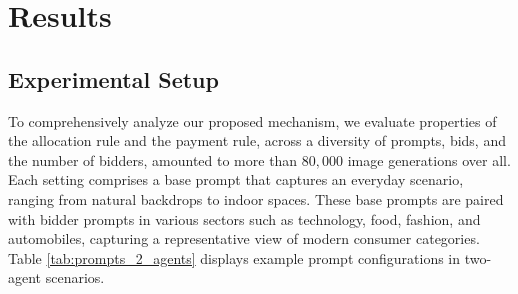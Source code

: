 \documentclass[format=acmsmall, review=false]{acmart}
\begin{document}


\section{Results}



\subsection{Experimental Setup}

To comprehensively analyze our proposed mechanism, we evaluate properties of the allocation rule and the payment rule, across a diversity of prompts, bids, and the number of bidders, amounted to more than $80,000$ image generations over all. Each setting comprises a base prompt that captures an everyday scenario, ranging from natural backdrops to indoor spaces. These base prompts are paired with bidder prompts in various sectors such as technology, food, fashion, and automobiles, capturing a representative view of modern consumer categories. Table \ref{tab:prompts_2_agents} displays example prompt configurations in two-agent scenarios.
\end{document}
